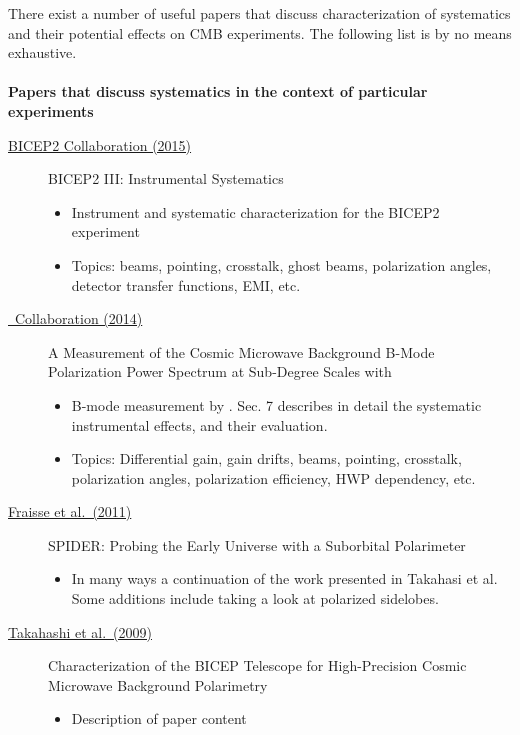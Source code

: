 There exist a number of useful papers that discuss characterization of systematics and their potential effects on CMB experiments. The following list is by no means exhaustive.
\\ \\
\textbf{Papers that discuss systematics in the context of particular experiments}
\begin{description}

\item[\href{https://arxiv.org/abs/1502.00608}{BICEP2 Collaboration (2015)}] BICEP2 III: Instrumental Systematics
\begin{itemize}[noitemsep]
\item Instrument and systematic characterization for the BICEP2 experiment
\item Topics: beams, pointing, crosstalk, ghost beams, polarization angles, detector transfer functions, EMI, etc.
\end{itemize}

\item[\href{https://arxiv.org/abs/1403.2369}{\pb\ Collaboration (2014)}] A Measurement of the Cosmic Microwave Background B-Mode Polarization Power Spectrum at Sub-Degree Scales with \pb\
\begin{itemize}[noitemsep]
\item B-mode measurement by \pb. Sec. 7 describes in detail the systematic instrumental effects, and their evaluation.
\item Topics: Differential gain, gain drifts, beams, pointing, crosstalk, polarization angles, polarization efficiency, HWP dependency, etc.
\end{itemize}

\item[\href{https://arxiv.org/abs/1106.3087}{Fraisse et al.\ (2011)}] SPIDER: Probing the Early Universe with a Suborbital Polarimeter
\begin{itemize}[noitemsep]
\item In many ways a continuation of the work presented in Takahasi et al. Some additions include taking a look at polarized sidelobes.
\end{itemize}

\item[\href{https://arxiv.org/abs/0906.4069}{Takahashi et al.\ (2009)}] Characterization of the BICEP Telescope for High-Precision Cosmic Microwave Background Polarimetry
\begin{itemize}[noitemsep]
\item Description of paper content
\end{itemize}


\end{description}
